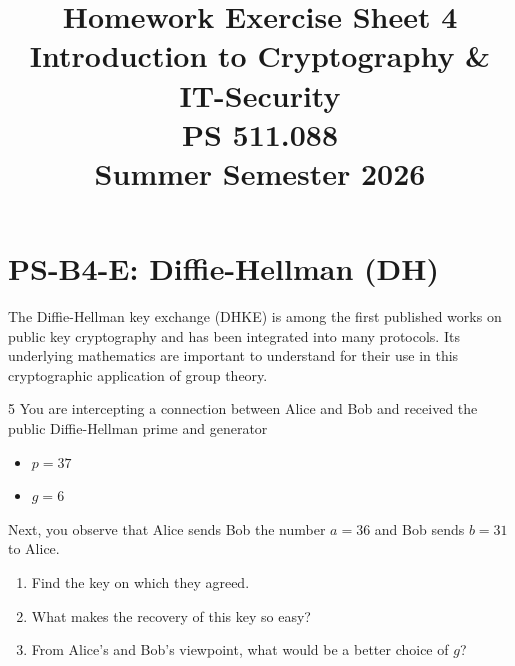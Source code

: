\documentclass[]{scrartcl}
\title{Homework Exercise Sheet 4\\Introduction to Cryptography \& IT-Security\\PS 511.088\\Summer Semester 2026}
\author{\groupname}
\newcounter{exercise}
\newcounter{qid}[section]
\newcommand{\exerciseprefix}{prefix}
\newcommand{\questiontitle}{Questions}
\newcommand{\blockid}{B4}
\newcommand{\exname}{}
\begin{document}
\maketitle
{}
\date{}
\newpage


\pagebreak


\renewcommand{\exname}{DH}
\section*{PS-\blockid{}-E\theexercise: Diffie-Hellman (DH)}
The Diffie-Hellman key exchange (DHKE) is among the first published works on public key cryptography and has been integrated into many protocols. Its underlying mathematics are important to understand for their use in this cryptographic application of group theory. 


\renewcommand{\exerciseprefix}{PS-\blockid{}-E\theexercise: \exname{}-Q\theqid}
\renewcommand{\questiontitle}{\exerciseprefix{}: Practical computing with DHKE}
\begin{exercisebox}{5}
You are intercepting a connection between Alice and Bob and received the public Diffie-Hellman prime and generator
\begin{itemize}
    \item $p = 37$
    \item $g = 6$
\end{itemize}
Next, you observe that Alice sends Bob the number $a = 36$ and Bob sends $b = 31$ to Alice.
\begin{enumerate}
    \item Find the key on which they agreed. 
    \item What makes the recovery of this key so easy? 
    \item From Alice's and Bob’s viewpoint, what would be a better choice of $g$?
\end{enumerate}
\end{exercisebox}
\end{document}
